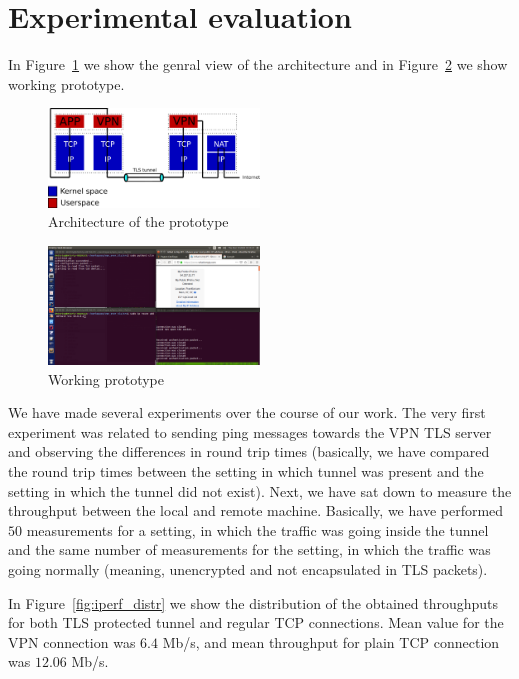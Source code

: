 \section{Experimental evaluation}
\label{section:experiments}



In Figure~\ref{fig:arch} we show the genral view of the architecture and in 
Figure~\ref{fig:prototype} we show working prototype.

\begin{figure}[!h]
        \includegraphics[width=0.5\textwidth]{graphics/architecture.png}
        \caption{Architecture of the prototype}
        \label{fig:arch}
\end{figure}

\begin{figure}[!h]
        \includegraphics[width=0.5\textwidth]{graphics/vpn_over_tls_prototype.png}
        \caption{Working prototype}
        \label{fig:prototype}
\end{figure}

We have made several experiments over the course of our work. The very first experiment was 
related to sending ping messages towards the VPN TLS server and observing the differences in
round trip times (basically, we have compared the round trip times between the setting in 
which tunnel was present and the setting in which the tunnel did not exist). Next, we have
sat down to measure the throughput between the local and remote machine. Basically, we have 
performed $50$ measurements for a setting, in which the traffic was going inside the tunnel
and the same number of measurements for the setting, in which the traffic was going 
normally (meaning, unencrypted and not encapsulated in TLS packets).

In Figure~\ref{fig:iperf_distr} we show the distribution of the obtained throughputs for both
TLS protected tunnel and regular TCP connections. Mean value for the VPN connection was 
$6.4$ Mb/s, and mean throughput for plain TCP connection was $12.06$ Mb/s.

